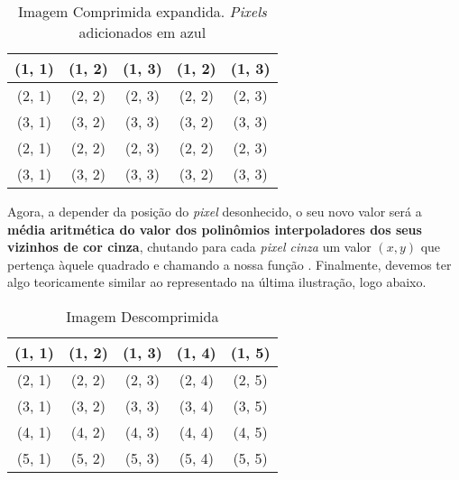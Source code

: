 \documentclass[11pt]{article}
\begin{document}
  \begin{table}[h!]
    \centering
    \begin{tabular}{| c | c | c | c | c |}
      \hline
      (1, 1) \cellcolor{gray} & (1, 2) \cellcolor{blue} & (1, 3) \cellcolor{gray} & (1, 2) \cellcolor{blue} & (1, 3) \cellcolor{gray} \\
      \hline
      (2, 1) \cellcolor{blue} & (2, 2) \cellcolor{blue} & (2, 3) \cellcolor{blue} & (2, 2) \cellcolor{blue} & (2, 3) \cellcolor{blue} \\
      \hline
      (3, 1) \cellcolor{gray} & (3, 2) \cellcolor{blue} & (3, 3) \cellcolor{gray} & (3, 2) \cellcolor{blue} & (3, 3) \cellcolor{gray} \\
      \hline
      (2, 1) \cellcolor{blue} & (2, 2) \cellcolor{blue} & (2, 3) \cellcolor{blue} & (2, 2) \cellcolor{blue} & (2, 3) \cellcolor{blue} \\
      \hline
      (3, 1) \cellcolor{gray} & (3, 2) \cellcolor{blue} & (3, 3) \cellcolor{gray} & (3, 2) \cellcolor{blue} & (3, 3) \cellcolor{gray} \\
      \hline
    \end{tabular}
    \caption*{Imagem Comprimida expandida. \textit{Pixels} adicionados em azul}
  \end{table}

  Agora, a depender da posição do \textit{pixel} desonhecido, o seu novo valor será a \textbf{média aritmética do valor dos polinômios interpoladores dos seus vizinhos de cor cinza}, chutando
  para cada \textit{pixel cinza} um valor $(x, y)$ que pertença àquele quadrado e chamando a nossa função {}. Finalmente, devemos ter algo teoricamente similar ao representado na última ilustração,
  logo abaixo.

  \begin{table}[h!]
    \centering
    \begin{tabular}{| c | c | c | c | c |}
      \hline
      (1, 1) \cellcolor{gray} & (1, 2) \cellcolor{apx1} & (1, 3) \cellcolor{gray} & (1, 4) \cellcolor{apx3} & (1, 5) \cellcolor{gray} \\
      \hline
      (2, 1) \cellcolor{apx1} & (2, 2) \cellcolor{apx1} & (2, 3) \cellcolor{apx2} & (2, 4) \cellcolor{apx2} & (2, 5) \cellcolor{apx3} \\
      \hline
      (3, 1) \cellcolor{gray} & (3, 2) \cellcolor{apx2} & (3, 3) \cellcolor{gray} & (3, 4) \cellcolor{apx2} & (3, 5) \cellcolor{gray} \\
      \hline
      (4, 1) \cellcolor{apx1} & (4, 2) \cellcolor{apx3} & (4, 3) \cellcolor{apx2} & (4, 4) \cellcolor{apx4} & (4, 5) \cellcolor{apx4} \\
      \hline
      (5, 1) \cellcolor{gray} & (5, 2) \cellcolor{apx3} & (5, 3) \cellcolor{gray} & (5, 4) \cellcolor{apx4} & (5, 5) \cellcolor{gray} \\
      \hline
    \end{tabular}
    \caption*{Imagem Descomprimida}
  \end{table}
\end{document}

